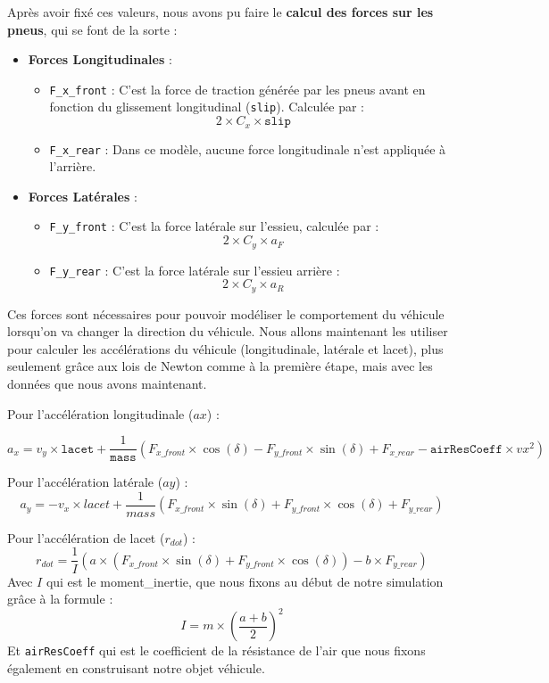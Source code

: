 Après avoir fixé ces valeurs, nous avons pu faire le \textbf{calcul des forces sur les pneus}, qui se font de la sorte :
\begin{itemize}
    \item \textbf{Forces Longitudinales} :
    \begin{itemize}[label=$\star$]
        \item \texttt{F\_x\_front} : C'est la force de traction générée par les pneus avant en fonction du glissement longitudinal (\texttt{slip}). Calculée par : $$2 \times C_x \times \texttt{slip}$$

        \item \texttt{F\_x\_rear} : Dans ce modèle, aucune force longitudinale n'est appliquée à l'arrière.
    \end{itemize}
    \item \textbf{Forces Latérales} :
    \begin{itemize}[label=$\star$]
        \item \texttt{F\_y\_front} : C'est la force latérale sur l'\gls{essieu}, calculée par : $$2 \times C_y \times a_F$$
        \item \texttt{F\_y\_rear} : C'est la force latérale sur l'\gls{essieu} arrière : $$2 \times C_y \times a_R$$
    \end{itemize}
\end{itemize}

Ces forces sont nécessaires pour pouvoir modéliser le comportement du véhicule lorsqu'on va changer la direction du véhicule.
Nous allons maintenant les utiliser pour calculer les accélérations du véhicule (longitudinale, latérale et lacet), plus seulement grâce aux lois de Newton comme à la première étape, mais avec les données que nous avons maintenant.

Pour l'accélération longitudinale ($ax$) :


$$a_x = v_y \times \texttt{lacet} + \frac{1}{\texttt{mass}}(F_{x\_front} \times \cos(\delta) - F_{y\_front} \times \sin(\delta) + F_{x\_rear} - \texttt{airResCoeff} \times vx^2)$$

Pour l'accélération latérale ($ay$) :
$$a_y=-v_x\times lacet + \frac{1}{mass}(F_{x\_front} \times \sin(\delta) + F_{y\_front} \times \cos(\delta) + F_{y\_rear})$$

Pour l'accélération de lacet ($r_{dot}$) :
$$r_{dot} = \frac{1}{I}(a \times (F_{x\_front} \times \sin(\delta) + F_{y\_front} \times \cos(\delta)) - b \times F_{y\_rear})$$
Avec $I$ qui est le \gls{moment_inertie}, que nous fixons au début de notre simulation grâce à la formule : $$I = m \times ({\frac{{a+b}}{2}})^2$$
Et \texttt{airResCoeff} qui est le coefficient de la résistance de l'air que nous fixons également en construisant notre objet véhicule. \newline

